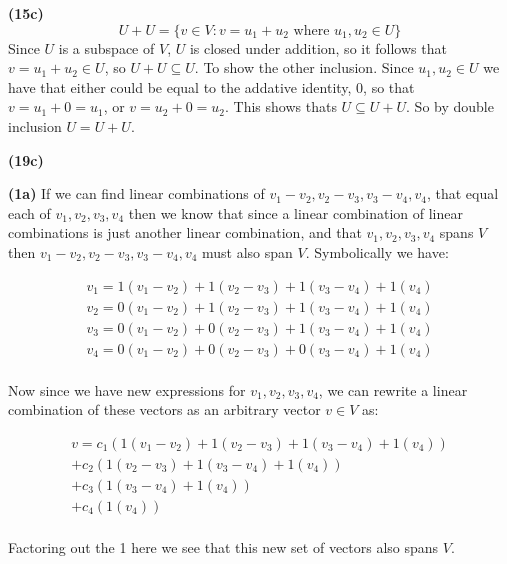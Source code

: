 \documentclass{article}
\begin{document}
\vspace{3mm}

\noindent\textbf{(15c)}
$$U + U = \{v \in V : v = u_1 + u_2 \text{ where } u_1,u_2 \in U \}$$
Since $U$ is a subspace of $V$, $U$ is closed under addition, so it follows that $v = u_1 + u_2 \in U$, so $U+U \subseteq U$. To show the other inclusion. Since $u_1, u_2 \in U$ we have that either could be equal to the addative identity, $0$, so that $v = u_1 + 0 = u_1$, or $v = u_2 + 0 = u_2$. This shows thats $U \subseteq U + U$. So by double inclusion $U = U+U$.


\vspace{3mm}

\noindent\textbf{(19c)}


\vspace{3mm}



\noindent\textbf{(1a)} If we can find linear combinations of $v_1 - v_2, v_2 - v_3, v_3 - v_4, v_4$, that equal each of $v_1, v_2, v_3, v_4$ then we know that since a linear combination of linear combinations is just another linear combination, and that $v_1, v_2, v_3, v_4$ spans $V$ then $v_1 - v_2, v_2 - v_3, v_3 - v_4, v_4$ must also span $V$. Symbolically we have:

\begin{gather*}
  v_1 = 1(v_1 - v_2) + 1(v_2 - v_3) + 1(v_3 - v_4) + 1(v_4) \\
  v_2 = 0(v_1 - v_2) + 1(v_2 - v_3) + 1(v_3 - v_4) + 1(v_4) \\
  v_3 = 0(v_1 - v_2) + 0(v_2 - v_3) + 1(v_3 - v_4) + 1(v_4) \\
  v_4 = 0(v_1 - v_2) + 0(v_2 - v_3) + 0(v_3 - v_4) + 1(v_4) \\
\end{gather*}

\noindent Now since we have new expressions for $v_1, v_2, v_3, v_4$, we can rewrite a linear combination of these vectors as an arbitrary vector $v \in V$ as:

\begin{gather*}
  v = c_1(1(v_1 - v_2) + 1(v_2 - v_3) + 1(v_3 - v_4) + 1(v_4))\\
  + c_2(1(v_2 - v_3) + 1(v_3 - v_4) + 1(v_4)) \\
  + c_3(1(v_3 - v_4) + 1(v_4)) \\
  + c_4(1(v_4)) \\
\end{gather*}

\noindent Factoring out the 1 here we see that this new set of vectors also spans $V$.
\end{document}
